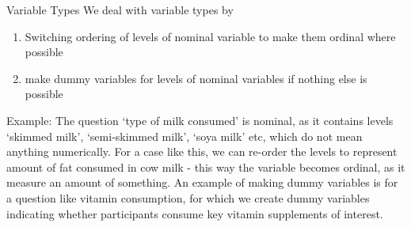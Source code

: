 \documentclass[10pt]{beamer} %
\begin{document}
\begin{frame}[plain]{Variable Types}
We deal with variable types by 
\vspace{0.3cm}
\begin{enumerate}
\item Switching ordering of levels of nominal variable to make them ordinal where possible
\item make dummy variables for levels of nominal variables if nothing else is possible
\end{enumerate}
\vspace{0.3cm}

Example: The question `type of milk consumed' is nominal, as it contains levels `skimmed milk', `semi-skimmed milk', `soya milk' etc, which do not mean anything numerically. For a case like this, we can re-order the levels to represent amount of fat consumed in cow milk - this way the variable becomes ordinal, as it measure an amount of something. An example of making dummy variables is for a question like vitamin consumption, for which we create dummy variables indicating whether participants consume key vitamin supplements of interest.   

\end{frame}
\end{document}
